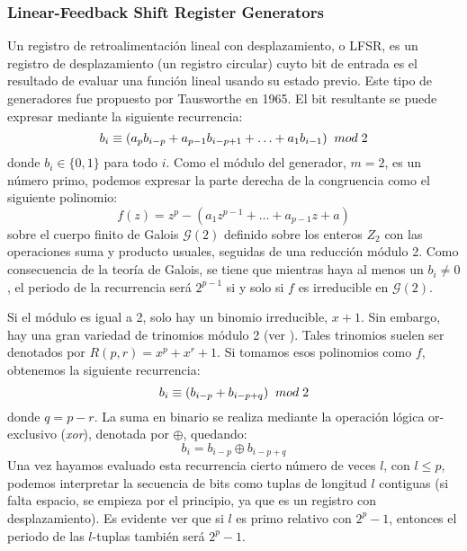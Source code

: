 
\subsubsection{Linear-Feedback Shift Register Generators}


Un registro de retroalimentación lineal con desplazamiento, o LFSR, es un registro de desplazamiento (un registro circular) cuyto bit de entrada es el resultado de evaluar una función lineal usando su estado previo. Este tipo de generadores fue propuesto por Tausworthe en 1965. El bit resultante se puede expresar mediante la siguiente recurrencia:
\begin{equation}
b_i \equiv (a_{p}b_{i-p}+a_{p-1}b_{i-p+1}+\ldots+a_{1}b_{i-1}) \;\;mod \; 2
\end{equation}
donde $b_i\in\{0,1\}$ para todo $i$. Como el módulo del generador, $m=2$, es un número primo, podemos expresar la parte derecha de la congruencia como el siguiente polinomio:
\[
f(z)=z^p-(a_{1}z^{p-1}+\ldots+a_{p-1}z+a)
\]
sobre el cuerpo finito de Galois $\mathcal{G}(2)$ definido sobre los enteros $Z_2$ con las operaciones suma y producto usuales, seguidas de una reducción módulo 2. Como consecuencia de la teoría de Galois, se tiene que mientras haya al menos un $b_i\neq 0$, el periodo de la recurrencia será $2^{p-1}$ si y solo si $f$ es irreducible en $\mathcal{G}(2)$.

Si el módulo es igual a 2, solo hay un binomio irreducible, $x+1$. Sin embargo, hay una gran variedad de trinomios módulo 2 (ver \cite{zierler1969}). Tales trinomios suelen ser denotados por $R(p,r)=x^p+x^r+1$. Si tomamos esos polinomios como $f$, obtenemos la siguiente recurrencia:
\[
b_i \equiv (b_{i-p}+b_{i-p+q}) \;\;mod \; 2
\]
donde $q=p-r$. La suma en binario se realiza mediante la operación lógica or-exclusivo (\textit{xor}), denotada por $\oplus$, quedando:
\[
b_i=b_{i-p}\oplus b_{i-p+q}
\]Una vez hayamos evaluado esta recurrencia cierto número de veces $l$, con $l\leq p$, podemos interpretar la secuencia de bits como tuplas de longitud $l$ contiguas (si falta espacio, se empieza por el principio, ya que es un registro con desplazamiento). Es evidente ver que si $l$ es primo relativo con $2^p-1$, entonces el periodo de las $l$-tuplas también será $2^p-1$.

